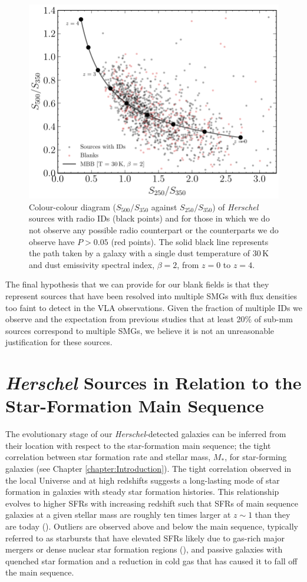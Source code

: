 \begin{figure}
	\centering
	\includegraphics[width=0.75\columnwidth]{Figures/blank_fir_colours.pdf}
	\caption[$S_{500}/S_{350}$ against $S_{250}/S_{350}$ plot of sources with and without radio IDs]{Colour-colour diagram ($S_{500}/S_{350}$ against $S_{250}/S_{350}$) of \textit{Herschel} sources with radio IDs (black points) and for those in which we do not observe any possible radio counterpart or the counterparts we do observe have $P > 0.05$ (red points). The solid black line represents the path taken by a galaxy with a single dust temperature of $30\,$K and dust emissivity spectral index, $\beta = 2$, from $z = 0$ to $z = 4$.}
	\label{fig:blank_fir_colours}
\end{figure}

The final hypothesis that we can provide for our blank fields is that they represent sources that have been resolved into multiple SMGs with flux densities too faint to detect in the VLA observations. Given the fraction of multiple IDs we observe and the expectation from previous studies that at least 20\% of sub-mm sources correspond to multiple SMGs, we believe it is not an unreasonable justification for these sources.

\section{\textit{Herschel} Sources in Relation to the Star-Formation Main Sequence}

The evolutionary stage of our \textit{Herschel}-detected galaxies can be inferred from their location with respect to the star-formation main sequence; the tight correlation between star formation rate and stellar mass, $M_*$, for star-forming galaxies (see Chapter \ref{chapter:Introduction}). The tight correlation observed in the local Universe and at high redshifts suggests a long-lasting mode of star formation in galaxies with steady star formation histories. This relationship evolves to higher SFRs with increasing redshift such that SFRs of main sequence galaxies at a given stellar mass are roughly ten times larger at $z\sim1$ than they are today (\citealt{Noeske_2007}). Outliers are observed above and below the main sequence, typically referred to as starbursts that have elevated SFRs likely due to gas-rich major mergers or dense nuclear star formation regions (\citealt{Daddi_2010}), and passive galaxies with quenched star formation and a reduction in cold gas that has caused it to fall off the main sequence. 

